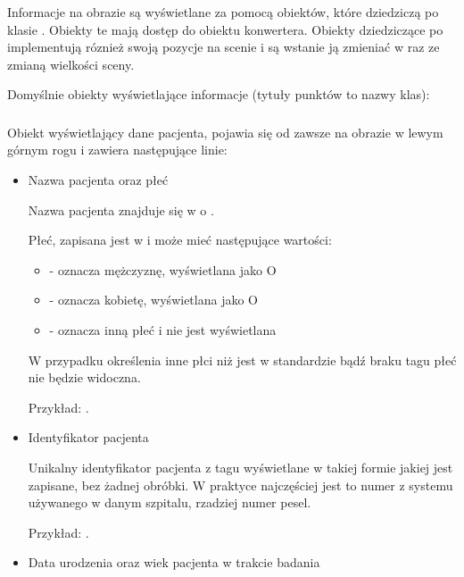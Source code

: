 
Informacje na obrazie są wyświetlane za pomocą obiektów, które dziedziczą po klasie .
Obiekty te mają dostęp do obiektu konwertera.
Obiekty dziedziczące po  implementują róznież swoją pozycje na scenie i są wstanie ją zmieniać w raz ze zmianą wielkości sceny.


Domyślnie obiekty wyświetlające informacje (tytuły punktów to nazwy klas):
\subsubsection{}

Obiekt wyświetlający dane pacjenta, pojawia się od zawsze na obrazie w lewym górnym rogu i zawiera następujące linie:
\begin{itemize}
    \item Nazwa pacjenta oraz płeć

          Nazwa pacjenta znajduje się w  o .

          Płeć, zapisana jest w  i może mieć następujące wartości:
          \begin{itemize}
              \item {} - oznacza mężczyznę, wyświetlana jako O
              \item {} - oznacza kobietę, wyświetlana jako O
              \item {} - oznacza inną płeć i nie jest wyświetlana
          \end{itemize}

          W przypadku określenia inne płci niż jest w standardzie bądź braku tagu płeć nie będzie widoczna.

          Przykład: .

    \item Identyfikator pacjenta

          Unikalny identyfikator pacjenta z tagu  wyświetlane w takiej formie jakiej jest zapisane, bez żadnej obróbki.
          W praktyce najczęściej jest to numer z systemu używanego w danym szpitalu, rzadziej numer pesel.

          Przykład: .

    \item Data urodzenia oraz wiek pacjenta w trakcie badania


\end{itemize}
